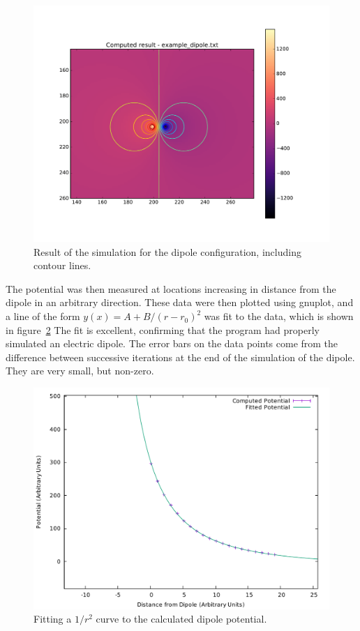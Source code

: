 \begin{figure}[h]
	\centering
	\center
	\includegraphics[width=1.1\linewidth]{dipole_contours.pdf}
	\caption{Result of the simulation for the dipole configuration, including contour lines.} \label{fig:dipole-cont}
	\end{figure}

The potential was then measured at locations increasing in distance from the dipole in an arbitrary direction.
These data were then plotted using gnuplot, and a line of the form $y(x) = A + B / (r-r_0)^2$ was fit to the
data, which is shown in figure~\ref{fig:dipole-fit} The fit is excellent, confirming that the program had properly simulated an electric dipole. The error
bars on the data points come from the difference between successive iterations at the end of the simulation of
the dipole. They are very small, but non-zero.



	\begin{figure}[h]
	\centering
	\includegraphics[width=\linewidth]{dipole_fit.pdf}
	\caption{Fitting a $1/r^2$ curve to the calculated dipole potential.} \label{fig:dipole-fit}
	\end{figure}

